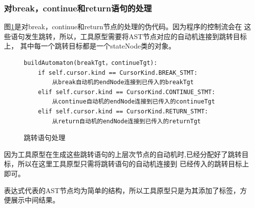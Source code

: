 \subsubsection{对break，continue和return语句的处理}
图\ref{跳转语句处理}是对break，continue和return节点的处理的伪代码。因为程序的控制流会在
这些语句发生跳转，所以，工具原型需要将AST节点对应的自动机连接到跳转目标上，
其中每一个跳转目标都是一个stateNode类的对象。

\begin{figure}[ht]
\centering
\begin{minipage}{12cm}
\begin{lstlisting}
buildAutomaton(breakTgt，continueTgt): 
    if self.cursor.kind == CursorKind.BREAK_STMT:            
        从break自动机的endNode连接到已传入的breakTgt
    elif self.cursor.kind == CursorKind.CONTINUE_STMT:
        从continue自动机的endNode连接到已传入的continueTgt
    elif self.cursor.kind == CursorKind.RETURN_STMT:
        从return自动机的endNode连接到已传入的returnTgt
\end{lstlisting}
\end{minipage}
    \caption{跳转语句处理}
    \label{跳转语句处理}
\end{figure}

因为工具原型在生成这些跳转语句的上层次节点的自动机时,已经分配好了跳转目标，所以在这里工具原型只需将跳转语句的自动机连接到
已经传入的跳转目标上即可。

表达式代表的AST节点均为简单的结构，所以工具原型只是为其添加了标签，方便展示中间结果。

